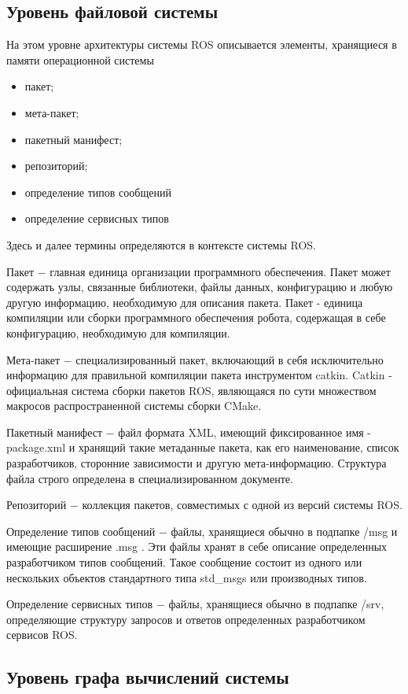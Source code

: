 \documentclass[oneside,final,14pt]{extreport}
\newcommand{\indentSpace}{1.25cm}
\begin{document}
\subsection{Уровень файловой системы}
На этом уровне архитектуры системы ROS описывается элементы, хранящиеся в памяти операционной системы
\begin{itemize}
\item пакет;
\setlength{\itemindent}{-\indentSpace }
\item мета-пакет;
\item пакетный манифест;
\item репозиторий;
\item определение типов сообщений
\item определение сервисных типов 
\end{itemize}

Здесь и далее термины определяются в контексте системы ROS.

Пакет $-$ главная единица организации программного обеспечения. Пакет может содержать узлы, связанные библиотеки, файлы данных, конфигурацию и любую другую информацию, необходимую для описания пакета.  Пакет - единица компиляции или сборки программного обеспечения робота, содержащая в себе конфигурацию, необходимую для компиляции. 

Мета-пакет $-$ специализированный пакет, включающий в себя исключительно информацию для правильной компиляции пакета инструментом catkin. Catkin - официальная система сборки пакетов ROS, являющаяся по сути множеством макросов распространенной системы сборки CMake.

Пакетный манифест $-$ файл формата XML, имеющий фиксированное имя - package.xml и хранящий такие метаданные пакета, как его наименование, список разработчиков, сторонние зависимости и другую мета-информацию. Структура файла строго определена в специализированном документе.

Репозиторий $-$ коллекция пакетов, совместимых с одной из версий системы  ROS.

Определение типов сообщений $-$ файлы, хранящиеся обычно в подпапке /msg и имеющие расширение  .msg . Эти файлы хранят в себе описание определенных разработчиком типов сообщений. Такое сообщение состоит из одного или нескольких объектов стандартного типа std_msgs или производных типов. 

Определение сервисных типов $-$ файлы, хранящиеся обычно в подпапке /srv, определяющие структуру запросов и ответов определенных разработчиком сервисов ROS.
\subsection{Уровень графа вычислений системы}
\end{document}
